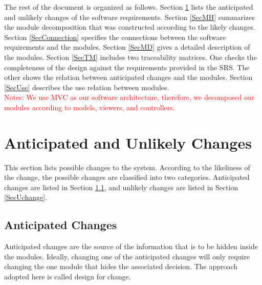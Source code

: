 \documentclass[12pt, titlepage]{article}
\begin{document}
\noindent The rest of the document is organized as follows. Section
\ref{SecChange} lists the anticipated and unlikely changes of the software
requirements. Section \ref{SecMH} summarizes the module decomposition that
was constructed according to the likely changes. Section \ref{SecConnection}
specifies the connections between the software requirements and the
modules. Section \ref{SecMD} gives a detailed description of the
modules. Section \ref{SecTM} includes two traceability matrices. One checks
the completeness of the design against the requirements provided in the SRS. The
other shows the relation between anticipated changes and the modules. Section
\ref{SecUse} describes the use relation between modules.\\

\noindent \textcolor{red}{Notes: We use MVC as our software architecture, therefore, we 
decomposed our modules according to models, viewers, and controllers.}

\section{Anticipated and Unlikely Changes} \label{SecChange}

This section lists possible changes to the system. According to the likeliness
of the change, the possible changes are classified into two
categories. Anticipated changes are listed in Section \ref{SecAchange}, and
unlikely changes are listed in Section \ref{SecUchange}.

\subsection{Anticipated Changes} \label{SecAchange}

Anticipated changes are the source of the information that is to be hidden
inside the modules. Ideally, changing one of the anticipated changes will only
require changing the one module that hides the associated decision. The approach
adopted here is called design for
change.
\end{document}
